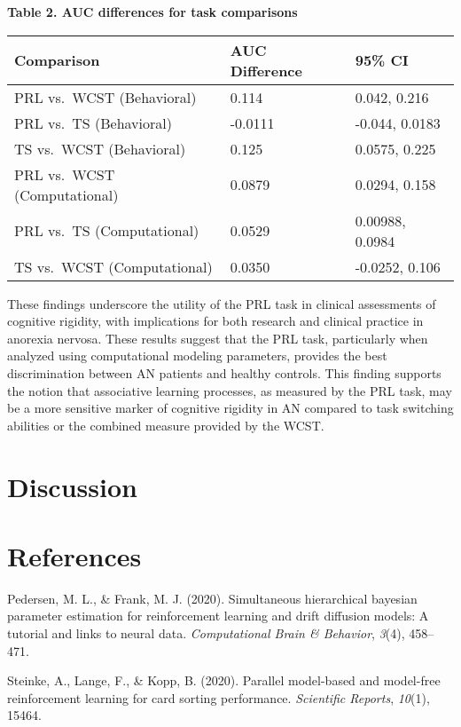 \documentclass[
  man]{apa6}
\newlength{\cslhangindent}
\newenvironment{CSLReferences}[2] %
 {\begin{list}{}{%
  \setlength{\itemindent}{0pt}
  \setlength{\leftmargin}{0pt}
  \setlength{\parsep}{0pt}
  \ifodd #1
   \setlength{\leftmargin}{\cslhangindent}
   \setlength{\itemindent}{-1\cslhangindent}
  \fi
  \setlength{\itemsep}{#2\baselineskip}}}
 {\end{list}}
\begin{document}
\textbf{Table 2. AUC differences for task comparisons}

\begin{longtable}[]{@{}lll@{}}
\toprule\noalign{}
Comparison & AUC Difference & 95\% CI \\
\midrule\noalign{}
\endhead
\bottomrule\noalign{}
\endlastfoot
PRL vs.~WCST (Behavioral) & 0.114 & 0.042, 0.216 \\
PRL vs.~TS (Behavioral) & -0.0111 & -0.044, 0.0183 \\
TS vs.~WCST (Behavioral) & 0.125 & 0.0575, 0.225 \\
PRL vs.~WCST (Computational) & 0.0879 & 0.0294, 0.158 \\
PRL vs.~TS (Computational) & 0.0529 & 0.00988, 0.0984 \\
TS vs.~WCST (Computational) & 0.0350 & -0.0252, 0.106 \\
\end{longtable}

These findings underscore the utility of the PRL task in clinical assessments of cognitive rigidity, with implications for both research and clinical practice in anorexia nervosa. These results suggest that the PRL task, particularly when analyzed using computational modeling parameters, provides the best discrimination between AN patients and healthy controls. This finding supports the notion that associative learning processes, as measured by the PRL task, may be a more sensitive marker of cognitive rigidity in AN compared to task switching abilities or the combined measure provided by the WCST.

\section{Discussion}\label{discussion}

\newpage

\section{References}\label{references}

\label{refs}
\begin{CSLReferences}{1}{0}
Pedersen, M. L., \& Frank, M. J. (2020). Simultaneous hierarchical bayesian parameter estimation for reinforcement learning and drift diffusion models: A tutorial and links to neural data. \emph{Computational Brain \& Behavior}, \emph{3}(4), 458--471.

Steinke, A., Lange, F., \& Kopp, B. (2020). Parallel model-based and model-free reinforcement learning for card sorting performance. \emph{Scientific Reports}, \emph{10}(1), 15464.

\end{CSLReferences}
\end{document}
